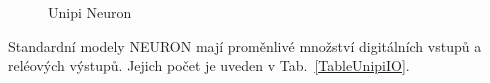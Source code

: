 \begin{figure}[!ht]
    \centering
			\hspace*{5mm}
			\hspace*{5mm}
			\caption{Unipi Neuron~\cite{UniPiBoard2}}
			\label{UnipiNeuronModels}
\end{figure}


Standardní modely NEURON mají proměnlivé množství digitálních vstupů a reléových výstupů. Jejich počet je uveden v Tab.~\ref{TableUnipiIO}.



